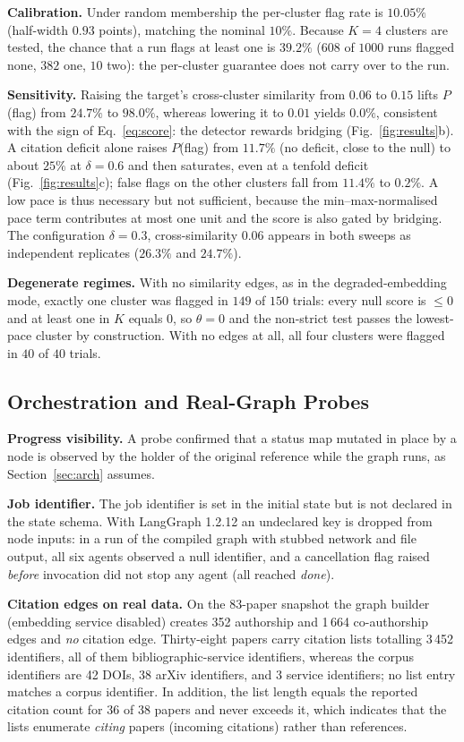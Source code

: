 \documentclass[conference]{IEEEtran}
\begin{document}
\textbf{Calibration.} Under random membership the per-cluster flag rate is $10.05\%$ (half-width $0.93$ points), matching the nominal $10\%$. Because $K=4$ clusters are tested, the chance that a run flags at least one is $39.2\%$ ($608$ of $1000$ runs flagged none, $382$ one, $10$ two): the per-cluster guarantee does not carry over to the run.

\textbf{Sensitivity.} Raising the target's cross-cluster similarity from $0.06$ to $0.15$ lifts $P$(flag) from $24.7\%$ to $98.0\%$, whereas lowering it to $0.01$ yields $0.0\%$, consistent with the sign of Eq.~\eqref{eq:score}: the detector rewards bridging (Fig.~\ref{fig:results}b). A citation deficit alone raises $P$(flag) from $11.7\%$ (no deficit, close to the null) to about $25\%$ at $\delta=0.6$ and then saturates, even at a tenfold deficit (Fig.~\ref{fig:results}c); false flags on the other clusters fall from $11.4\%$ to $0.2\%$. A low pace is thus necessary but not sufficient, because the min--max-normalised pace term contributes at most one unit and the score is also gated by bridging. The configuration $\delta=0.3$, cross-similarity $0.06$ appears in both sweeps as independent replicates ($26.3\%$ and $24.7\%$).

\textbf{Degenerate regimes.} With no similarity edges, as in the degraded-embedding mode, exactly one cluster was flagged in $149$ of $150$ trials: every null score is $\le0$ and at least one in $K$ equals $0$, so $\theta=0$ and the non-strict test passes the lowest-pace cluster by construction. With no edges at all, all four clusters were flagged in $40$ of $40$ trials.

\subsection{Orchestration and Real-Graph Probes}
\textbf{Progress visibility.} A probe confirmed that a status map mutated in place by a node is observed by the holder of the original reference while the graph runs, as Section~\ref{sec:arch} assumes.

\textbf{Job identifier.} The job identifier is set in the initial state but is not declared in the state schema. With LangGraph 1.2.12 an undeclared key is dropped from node inputs: in a run of the compiled graph with stubbed network and file output, all six agents observed a null identifier, and a cancellation flag raised \emph{before} invocation did not stop any agent (all reached \textit{done}).

\textbf{Citation edges on real data.} On the 83-paper snapshot the graph builder (embedding service disabled) creates 352 authorship and 1\,664 co-authorship edges and \emph{no} citation edge. Thirty-eight papers carry citation lists totalling 3\,452 identifiers, all of them bibliographic-service identifiers, whereas the corpus identifiers are 42 DOIs, 38 arXiv identifiers, and 3 service identifiers; no list entry matches a corpus identifier. In addition, the list length equals the reported citation count for 36 of 38 papers and never exceeds it, which indicates that the lists enumerate \emph{citing} papers (incoming citations) rather than references.
\end{document}
